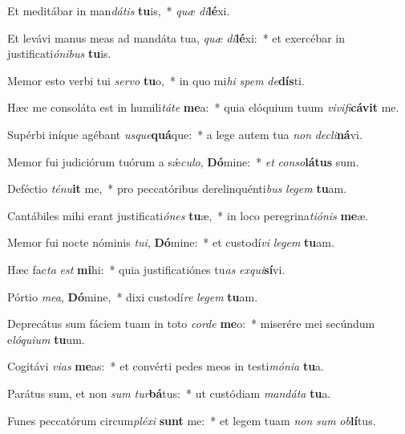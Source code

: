 \item Et meditábar in man\textit{dá}\textit{tis} \textbf{tu}is,~* \textit{quæ} \textit{di}\textbf{lé}xi.
\item Et levávi manus meas ad mandáta tua, \textit{quæ} \textit{di}\textbf{lé}xi:~* et exercébar in justificati\textit{ó}\textit{ni}\textit{bus} \textbf{tu}is.
\item Memor esto verbi tui \textit{ser}\textit{vo} \textbf{tu}o,~* in quo mi\textit{hi} \textit{spem} \textit{de}\textbf{dís}ti.
\item Hæc me consoláta est in humili\textit{tá}\textit{te} \textbf{me}a:~* quia elóquium tuum \textit{vi}\textit{vi}\textit{fi}\textbf{cá}\textbf{vit} me.
\item Supérbi iníque agébant \textit{us}\textit{que}\textbf{quá}que:~* a lege autem tua \textit{non} \textit{de}\textit{cli}\textbf{ná}vi.
\item Memor fui judiciórum tuórum a sǽ\textit{cu}\textit{lo}, \textbf{Dó}mine:~* \textit{et} \textit{con}\textit{so}\textbf{lá}\textbf{tus} sum.
\item Deféctio \textit{té}\textit{nu}\textbf{it} me,~* pro peccatóribus derelinquénti\textit{bus} \textit{le}\textit{gem} \textbf{tu}am.
\item Cantábiles mihi erant justificati\textit{ó}\textit{nes} \textbf{tu}æ,~* in loco peregrina\textit{ti}\textit{ó}\textit{nis} \textbf{me}æ.
\item Memor fui nocte nóminis \textit{tu}\textit{i}, \textbf{Dó}mine:~* et custodí\textit{vi} \textit{le}\textit{gem} \textbf{tu}am.
\item Hæc fac\textit{ta} \textit{est} \textbf{mi}hi:~* quia justificatiónes tu\textit{as} \textit{ex}\textit{qui}\textbf{sí}vi.
\item Pórtio \textit{me}\textit{a}, \textbf{Dó}mine,~* dixi custodí\textit{re} \textit{le}\textit{gem} \textbf{tu}am.
\item Deprecátus sum fáciem tuam in toto \textit{cor}\textit{de} \textbf{me}o:~* miserére mei secúndum e\textit{ló}\textit{qui}\textit{um} \textbf{tu}um.
\item Cogitávi \textit{vi}\textit{as} \textbf{me}as:~* et convérti pedes meos in testi\textit{mó}\textit{ni}\textit{a} \textbf{tu}a.
\item Parátus sum, et non \textit{sum} \textit{tur}\textbf{bá}tus:~* ut custódiam \textit{man}\textit{dá}\textit{ta} \textbf{tu}a.
\item Funes peccatórum circum\textit{plé}\textit{xi} \textbf{sunt} me:~* et legem tuam \textit{non} \textit{sum} \textit{ob}\textbf{lí}tus.
